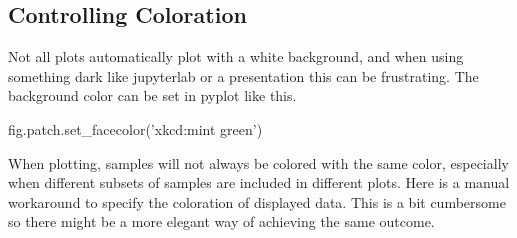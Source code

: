 \documentclass[]{book}
\newenvironment{Shaded}{\begin{snugshade}}{\end{snugshade}}
\newcommand{\StringTok}[1]{\textcolor[rgb]{0.31,0.60,0.02}{#1}}
\newcommand{\NormalTok}[1]{#1}
\begin{document}
\subsection{Controlling Coloration}\label{controlling-coloration}

Not all plots automatically plot with a white background, and when using
something dark like jupyterlab or a presentation this can be
frustrating. The background color can be set in pyplot like this.

\begin{Shaded}
\begin{Highlighting}[]
\NormalTok{fig.patch.set_facecolor(}\StringTok{'xkcd:mint green'}\NormalTok{)}
\end{Highlighting}
\end{Shaded}

When plotting, samples will not always be colored with the same color,
especially when different subsets of samples are included in different
plots. Here is a manual workaround to specify the coloration of
displayed data. This is a bit cumbersome so there might be a more
elegant way of achieving the same outcome.
\end{document}
